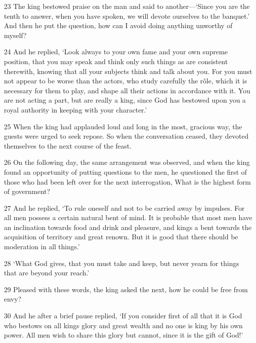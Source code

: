 \par 23 The king bestowed praise on the man and said to another—‘Since you are the tenth to answer, when you have spoken, we will devote ourselves to the banquet.’ And then he put the question, how can I avoid doing anything unworthy of myself?

\par 24 And he replied, ‘Look always to your own fame and your own supreme position, that you may speak and think only such things as are consistent therewith, knowing that all your subjects think and talk about you. For you must not appear to be worse than the actors, who study carefully the rôle, which it is necessary for them to play, and shape all their actions in accordance with it. You are not acting a part, but are really a king, since God has bestowed upon you a royal authority in keeping with your character.’

\par 25 When the king had applauded loud and long in the most, gracious way, the guests were urged to seek repose. So when the conversation ceased, they devoted themselves to the next course of the feast.

\par 26 On the following day, the same arrangement was observed, and when the king found an opportunity of putting questions to the men, he questioned the first of those who had been left over for the next interrogation, What is the highest form of government?

\par 27 And he replied, ‘To rule oneself and not to be carried away by impulses. For all men possess a certain natural bent of mind. It is probable that most men have an inclination towards food and drink and pleasure, and kings a bent towards the acquisition of territory and great renown. But it is good that there should be moderation in all things.’

\par 28 ‘What God gives, that you must take and keep, but never yearn for things that are beyond your reach.’

\par 29 Pleased with these words, the king asked the next, how he could be free from envy?

\par 30 And he after a brief pause replied, ‘If you consider first of all that it is God who bestows on all kings glory and great wealth and no one is king by his own power. All men wish to share this glory but cannot, since it is the gift of God!’

